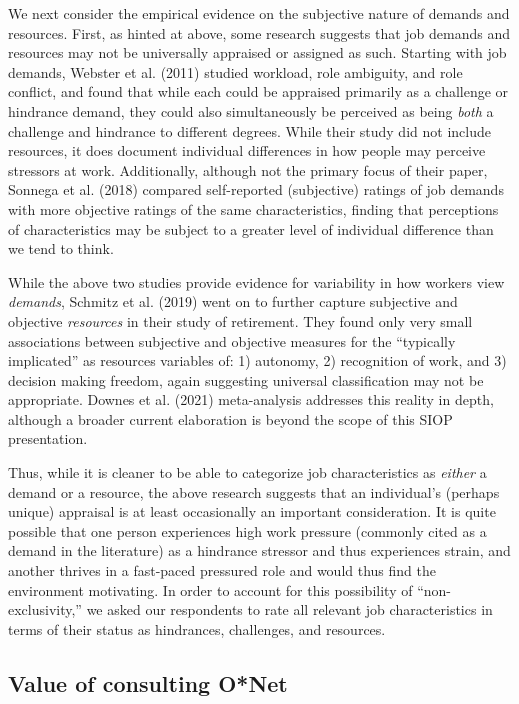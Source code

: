 \documentclass[
  english,
  man]{apa6}
\begin{document}
We next consider the empirical evidence on the subjective nature of demands and resources. First, as hinted at above, some research suggests that job demands and resources may not be universally appraised or assigned as such. Starting with job demands, Webster et al. (2011) studied workload, role ambiguity, and role conflict, and found that while each could be appraised primarily as a challenge or hindrance demand, they could also simultaneously be perceived as being \emph{both} a challenge and hindrance to different degrees. While their study did not include resources, it does document individual differences in how people may perceive stressors at work. Additionally, although not the primary focus of their paper, Sonnega et al. (2018) compared self-reported (subjective) ratings of job demands with more objective ratings of the same characteristics, finding that perceptions of characteristics may be subject to a greater level of individual difference than we tend to think.

While the above two studies provide evidence for variability in how workers view \emph{demands}, Schmitz et al. (2019) went on to further capture subjective and objective \emph{resources} in their study of retirement. They found only very small associations between subjective and objective measures for the ``typically implicated'' as resources variables of: 1) autonomy, 2) recognition of work, and 3) decision making freedom, again suggesting universal classification may not be appropriate. Downes et al. (2021) meta-analysis addresses this reality in depth, although a broader current elaboration is beyond the scope of this SIOP presentation.

Thus, while it is cleaner to be able to categorize job characteristics as \emph{either} a demand or a resource, the above research suggests that an individual's (perhaps unique) appraisal is at least occasionally an important consideration. It is quite possible that one person experiences high work pressure (commonly cited as a demand in the literature) as a hindrance stressor and thus experiences strain, and another thrives in a fast-paced pressured role and would thus find the environment motivating. In order to account for this possibility of ``non-exclusivity,'' we asked our respondents to rate all relevant job characteristics in terms of their status as hindrances, challenges, and resources.

\hypertarget{value-of-consulting-onet}{%
\subsection{Value of consulting O*Net}\label{value-of-consulting-onet}}
\end{document}
